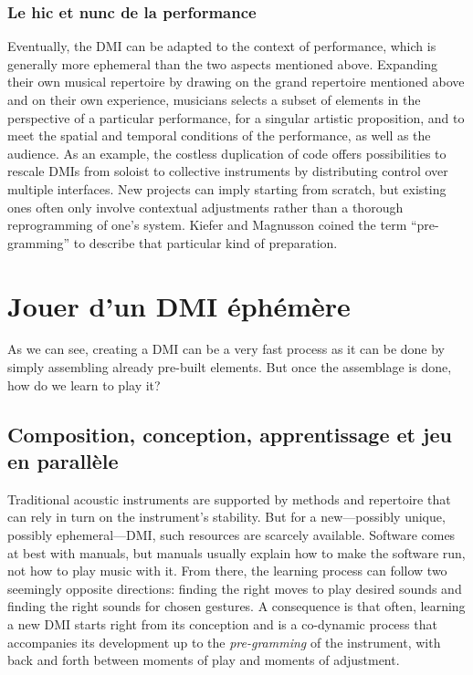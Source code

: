 \subsubsection{Le hic et nunc de la performance}
Eventually, the DMI can be adapted to the context of performance, which is generally more ephemeral than the two aspects mentioned above.
	Expanding their own musical repertoire by drawing on the grand repertoire mentioned above and on their own experience, musicians selects a subset of elements in the perspective of a particular performance, for a singular artistic proposition, and to meet the spatial and temporal conditions of the performance, as well as the audience. As an example, the costless duplication of code offers possibilities to rescale DMIs from soloist to collective instruments by distributing control over multiple interfaces. New projects can imply starting from scratch, but existing ones often only involve contextual adjustments rather than a thorough reprogramming of one's system. Kiefer and Magnusson coined the term “pre-gramming” \cite{kiefer_live_2019} to describe that particular kind of preparation.
	

\section{Jouer d'un DMI éphémère}

As we can see, creating a DMI can be a very fast process as it can be done by simply assembling already pre-built elements. But once the assemblage is done, how do we learn to play it?

\subsection{Composition, conception, apprentissage et jeu en parallèle}
	Traditional acoustic instruments are supported by methods and repertoire that can rely in turn on the instrument's stability. But for a new—possibly unique, possibly ephemeral—DMI, such resources are scarcely available. Software comes at best with manuals, but manuals usually explain how to make the software run, not how to play music with it.
	From there, the learning process can follow two seemingly opposite directions: finding the right moves to play desired sounds and finding the right sounds for chosen gestures. A consequence is that often, learning a new DMI starts right from its conception and is a co-dynamic process that accompanies its development up to the \textit{pre-gramming} of the instrument, with back and forth between moments of play and moments of adjustment.

